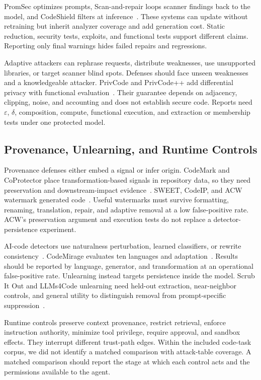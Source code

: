 \documentclass[acmsmall,screen,review]{acmart}
\begin{document}
PromSec optimizes prompts, Scan-and-repair loops scanner findings back to the model, and CodeShield filters at inference~\cite{promsec2024,guiding2025fix,codeshield2024}. These systems can update without retraining but inherit analyzer coverage and add generation cost. Static reduction, security tests, exploits, and functional tests support different claims. Reporting only final warnings hides failed repairs and regressions.

Adaptive attackers can rephrase requests, distribute weaknesses, use unsupported libraries, or target scanner blind spots. Defenses should face unseen weaknesses and a knowledgeable attacker. PrivCode and PrivCode++ add differential privacy with functional evaluation~\cite{privcode2026,privcodeplus2026}. Their guarantee depends on adjacency, clipping, noise, and accounting and does not establish secure code. Reports need $\varepsilon$, $\delta$, composition, compute, functional execution, and extraction or membership tests under one protected model.

\subsection{Provenance, Unlearning, and Runtime Controls}
Provenance defenses either embed a signal or infer origin. CodeMark and CoProtector place transformation-based signals in repository data, so they need preservation and downstream-impact evidence~\cite{codemark2023,coprotector2022}. SWEET, CodeIP, and ACW watermark generated code~\cite{lee2024sweet,guan2024codeip,li2024acw}. Useful watermarks must survive formatting, renaming, translation, repair, and adaptive removal at a low false-positive rate. ACW's preservation argument and execution tests do not replace a detector-persistence experiment.

AI-code detectors use naturalness perturbation, learned classifiers, or rewrite consistency~\cite{shi2025betweenlines,nguyen2024gptsniffer,ye2025uncovering}. CodeMirage evaluates ten languages and adaptation~\cite{guo2025codemirage}. Results should be reported by language, generator, and transformation at an operational false-positive rate. Unlearning instead targets persistence inside the model. Scrub It Out and LLMs4Code unlearning need held-out extraction, near-neighbor controls, and general utility to distinguish removal from prompt-specific suppression~\cite{chu2026scrubitout,gu2026unlearning}.

Runtime controls preserve context provenance, restrict retrieval, enforce instruction authority, minimize tool privilege, require approval, and sandbox effects. They interrupt different trust-path edges. Within the included code-task corpus, we did not identify a matched comparison with attack-table coverage. A matched comparison should report the stage at which each control acts and the permissions available to the agent.
\end{document}
